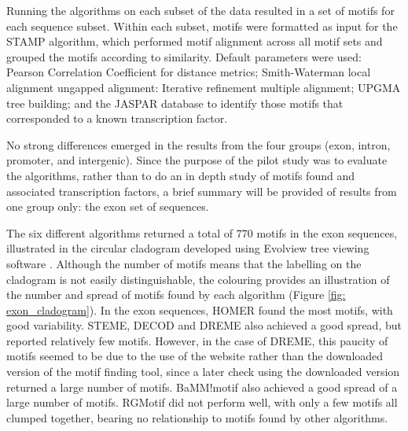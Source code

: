\documentclass[12pt]{article}
\begin{document}
Running the algorithms on each subset of the data resulted in a set of motifs for each sequence subset. Within each subset, motifs were formatted as input for the STAMP algorithm, which performed motif alignment across all motif sets and grouped the motifs according to similarity. Default parameters were used: Pearson Correlation Coefficient for distance metrics; Smith-Waterman local alignment ungapped alignment: Iterative refinement multiple alignment; UPGMA tree building; and the JASPAR database \citep{sandelin2004jaspar} to identify those motifs that corresponded to a known transcription factor.  

No strong differences emerged in the results from the four groups (exon, intron, promoter, and intergenic). Since the purpose of the pilot study was to evaluate the algorithms, rather than to do an in depth study of motifs found and associated transcription factors, a brief summary will be provided of results from one group only: the exon set of sequences. 

The six different algorithms returned a total of 770 motifs in the exon sequences, illustrated in the circular cladogram developed using Evolview tree viewing software  \citep{He2016}. Although the number of motifs means that the labelling on the cladogram is not easily distinguishable, the colouring provides an illustration of the number and spread of motifs found by each algorithm (Figure \ref{fig: exon_cladogram}). In the exon sequences, HOMER found the most motifs, with good variability. STEME, DECOD and DREME also achieved a good spread, but reported relatively few motifs. However, in the case of DREME, this paucity of motifs seemed to be due to the use of the website rather than the downloaded version of the motif finding tool, since a later check using the downloaded version returned a large number of motifs. BaMM!motif also achieved a good spread of a large number of motifs. RGMotif did not perform well, with only a few motifs all clumped together, bearing no relationship to motifs found by other algorithms.
\end{document}

